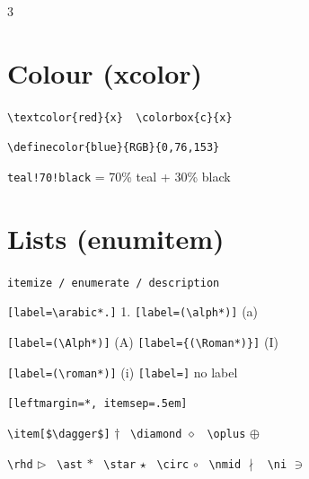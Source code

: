 \documentclass[a4paper]{article}
\newcommand{\C}[1]{\texttt{\footnotesize #1}}
\begin{document}
{\begin{multicols}{3}
\section{Colour (xcolor)}
\C{\textbackslash textcolor\{red\}\{x\} \ \textbackslash colorbox\{c\}\{x\}}\par
\C{\textbackslash definecolor\{blue\}\{RGB\}\{0,76,153\}}\par
\C{teal!70!black} = 70\% teal + 30\% black

\section{Lists (enumitem)}
\C{itemize / enumerate / description}\par
\C{[label=\textbackslash arabic*.]} 1. \quad \C{[label=(\textbackslash alph*)]} (a)\par
\C{[label=(\textbackslash Alph*)]} (A) \quad \C{[label=\{(\textbackslash Roman*)\}]} (I)\par
\C{[label=(\textbackslash roman*)]} (i) \quad \C{[label=]} no label\par
\C{[leftmargin=*, itemsep=.5em]}\par
\C{\textbackslash item[\$\textbackslash dagger\$]} $\dagger$ \ \C{\textbackslash diamond} $\diamond$ \ \C{\textbackslash oplus} $\oplus$\par
\C{\textbackslash rhd} $\rhd$ \ \C{\textbackslash ast} $\ast$ \ \C{\textbackslash star} $\star$ \ \C{\textbackslash circ} $\circ$ \ \C{\textbackslash nmid} $\nmid$ \ \C{\textbackslash ni} $\ni$


\end{multicols}}
\end{document}
